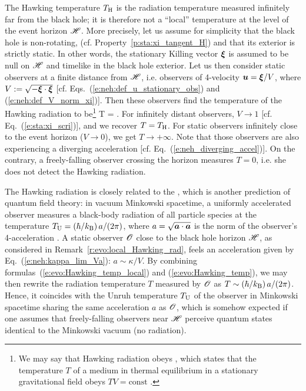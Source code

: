 \begin{remark}\label{r:evo:local_Hawking_rad}
The Hawking temperature $T_{\rm H}$ is the radiation temperature measured
infinitely far from the black hole; it is therefore not a ``local'' temperature
at the level of the event horizon $\mathscr{H}$.
More precisely, let us assume for simplicity that the black hole is non-rotating,
(cf. Property~\ref{p:sta:xi_tangent_H}) and that its exterior is strictly static. In other words,
the stationary Killing vector $\bm{\xi}$ is assumed to be null on $\mathscr{H}$  and
timelike in the black hole exterior. Let us then consider static observers at a finite distance
from $\mathscr{H}$, i.e. observers
of 4-velocity $\bm{u} = \bm{\xi} / V$, where $V := \sqrt{-\bm{\xi}\cdot\bm{\xi}}$
[cf. Eqs.~(\ref{e:neh:def_u_stationary_obs}) and (\ref{e:neh:def_V_norm_xi})].
Then these observers find the temperature of the Hawking radiation to
be\footnote{We may say
that Hawking radiation obeys , which
states that the temperature $T$ of a medium in thermal equilibrium in a stationary gravitational field
obeys $T V = \mathrm{const}$ \cite{SantiV19}.}
\be \label{e:evo:Hawking_temp_local}
    T =  .
\ee
For infinitely distant observers, $V\to 1$ [cf. Eq.~(\ref{e:sta:xi_scri})], and we recover $T=T_{\rm H}$.
For static observers infinitely close to the event horizon ($V\to 0$), we get
$T\to +\infty$. Note that those observers are
also experiencing a diverging acceleration [cf. Eq.~(\ref{e:neh_diverging_accel})].
On the contrary, a freely-falling observer crossing the horizon measures
$T=0$, i.e. she does not detect the Hawking radiation.
\end{remark}

\begin{remark}
The Hawking radiation is closely related to the
, which is another prediction of quantum field theory:
in vacuum Minkowski spacetime, a uniformly accelerated observer measures a black-body radiation
of all particle species at the temperature $T_{\rm U} = (\hbar/k_{\rm B}) \, a / (2\pi)$, where
$a = \sqrt{\bm{a}\cdot\bm{a}}$ is the norm of the observer's 4-acceleration \cite{Unruh76,Wald94,Carro04}.
A static observer $\mathscr{O}$ close to the black hole horizon $\mathscr{H}$, as considered in Remark~\ref{r:evo:local_Hawking_rad},
feels an acceleration given by Eq.~(\ref{e:neh:kappa_lim_Va}): $a \sim \kappa / V$.
By combining formulas~(\ref{e:evo:Hawking_temp_local}) and (\ref{e:evo:Hawking_temp}),
we may then rewrite the radiation temperature $T$ measured by $\mathscr{O}$ as
$T \sim (\hbar/k_{\rm B}) \, a / (2\pi)$. Hence, it coincides with the Unruh temperature $T_{\rm U}$ of
the observer in Minkowski spacetime sharing the same acceleration $a$ as $\mathscr{O}$, which is somehow expected
if one assumes that freely-falling observers near $\mathscr{H}$ perceive quantum states identical to
the Minkowski vacuum (no radiation).
\end{remark}


